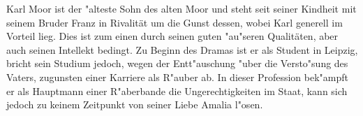 Karl Moor ist der "alteste Sohn des alten Moor und steht seit seiner Kindheit mit seinem Bruder Franz in Rivalität um die Gunst dessen, wobei Karl generell im Vorteil lieg. Dies ist zum einen durch seinen guten "au"seren Qualitäten, aber auch seinen Intellekt bedingt.
Zu Beginn des Dramas ist er als Student in Leipzig, bricht sein Studium jedoch, wegen der Entt"auschung "uber die Versto"sung des Vaters, zugunsten einer Karriere als R"auber ab. In dieser Profession bek"ampft er als Hauptmann einer R"aberbande die Ungerechtigkeiten im Staat, kann sich jedoch zu keinem Zeitpunkt von seiner Liebe Amalia l"osen.